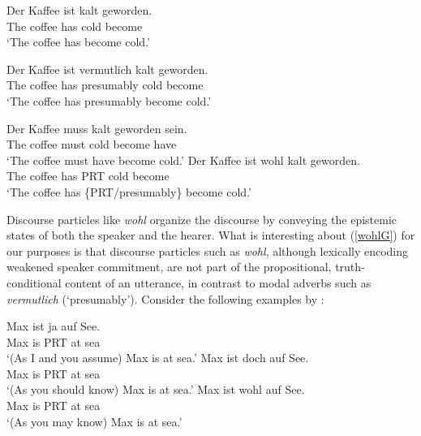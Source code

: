 \documentclass[11pt]{article}
\begin{document}
\begin{exe}
	\ex\label{german} \begin{xlist}
		\ex\label{bareG} \gll Der Kaffee ist kalt geworden. \\
		The coffee has cold become\\
		\glt `The coffee has become cold.'
				
		\ex\label{probG} \gll Der Kaffee ist vermutlich kalt geworden.\\
				The coffee has presumably cold become\\
		\glt `The coffee has presumably become cold.'

		\ex\label{mustG} \gll Der Kaffee muss kalt geworden sein. \\
						The coffee must  cold become have\\
		\glt `The coffee must have become cold.'
		\ex\label{wohlG} \gll Der Kaffee ist wohl kalt geworden.\\
						The coffee has PRT cold become\\
		\glt `The coffee has \{PRT/presumably\} become cold.'
	\end{xlist}
\end{exe}

Discourse particles like \emph{wohl} organize the discourse by conveying the epistemic states of both the speaker and the hearer. What is interesting about (\ref{wohlG}) for our purposes is that discourse particles such as \emph{wohl}, although lexically encoding weakened speaker commitment, are not part of the propositional, truth-conditional content of an utterance, in contrast to modal adverbs such as \emph{vermutlich} (`presumably’). Consider the following examples by \citet[][p.~2013]{Zimmermann2011}:

\begin{exe}
\ex \label{dparticles}
\begin{xlist}
\ex \gll Max ist	ja auf See.\\
Max is	 PRT at sea\\
\trans `(As I and you assume) Max is at sea.'
\ex \gll Max ist doch auf See.\\
Max is	 PRT at sea\\
\trans `(As you should know) Max is at sea.'
\ex \gll Max ist wohl auf See.\\
Max is	PRT at	sea\\
\trans `(As you may know) Max is at sea.'
\end{xlist}
\end{exe}
\end{document}
